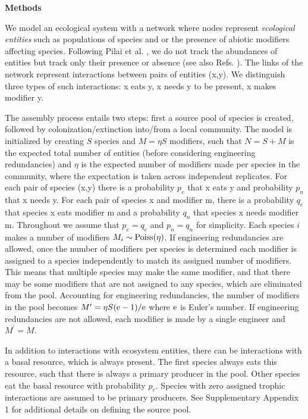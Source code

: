 \documentclass[twocolumn,preprintnumbers,amsmath,amssymb,superscriptaddress,linenumbers]{revtex4-1}
\newcommand{\rr}[1]{{\rm #1}}
\begin{document}
\begin{bibunit}
\vspace{-2mm}
\noindent \textbf{Methods}\\
  \footnotesize{
  We model an ecological system with a network where nodes represent \emph{ecological entities} such as populations of species and or the presence of abiotic modifiers affecting species.
  Following Pilai et al. \cite{Pillai2011}, we do not track the abundances of entities but track only their presence or absence (see also Refs. \cite{Luh1993,Campbell2011}).
  The links of the network represent interactions between pairs of entities (x,y).
  We distinguish three types of such interactions: x eats y, x needs y to be present, x makes modifier y.

  The assembly process entails two steps: first a source pool of species is created, followed by colonization/extinction into/from a local community.
  The model is initialized by creating $S$ species and $M = \eta S$ modifiers, such that $N=S+M$ is the expected total number of entities (before considering engineering redundancies) and $\eta$ is the expected number of modifiers made per species in the community, where the expectation is taken across independent replicates.
  For each pair of species (x,y) there is a probability $p_e$ that x eats y and probability $p_n$ that x needs y.
  For each pair of species x and modifier m, there is a probability $q_e$ that species x eats modifier m and a probability $q_n$ that species x needs modifier m.
  Throughout we assume that $p_e = q_e$ and $p_n = q_n$ for simplicity.
  Each species $i$ makes a number of modifiers $M_i \sim \rr{Poiss}(\eta)$. %
  If engineering redundancies are allowed, once the number of modifiers per species is determined each modifier is assigned to a species independently to match its assigned number of modifiers.
  This means that multiple species may make the same modifier, and that there may be some modifiers that are not assigned to any species, which are eliminated from the pool.
  Accounting for engineering redundancies, the number of modifiers in the pool becomes $M^\prime = \eta S (\rr{e}-1)/\rr{e}$ where $\rr{e}$ is Euler's number.
  If engineering redundancies are not allowed, each modifier is made by a single engineer and $M^\prime = M$.
  
  In addition to interactions with ecosystem entities, there can be interactions with a basal resource, which is always present.
  The first species always eats this resource, such that there is always a primary producer in the pool.
  Other species eat the basal resource with probability $p_e$.
  Species with zero assigned trophic interactions are assumed to be primary producers.
  See Supplementary Appendix 1 for additional details on defining the source pool.

}
\end{bibunit}
\end{document}
